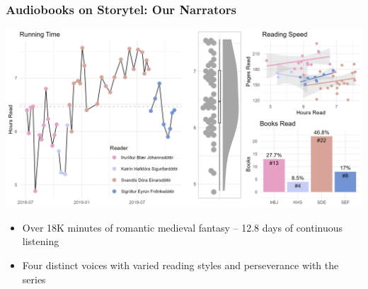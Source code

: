 \begin{frame}
    \frametitle{Audiobooks on Storytel: Our Narrators}
    \includegraphics[width=\textwidth]{../R/figures/storytel_readers}
    \vspace{-18pt}
    \begin{itemize}
        \item Over 18K minutes of romantic medieval fantasy -- 12.8 days of continuous listening
        \item Four distinct voices with varied reading styles and perseverance with the series
    \end{itemize}
\end{frame}
